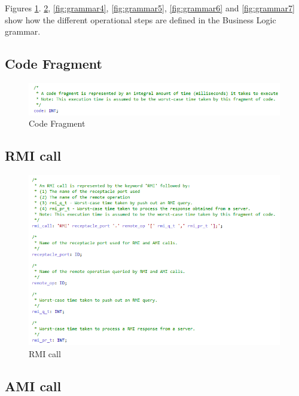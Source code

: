 Figures \ref{fig:code_fragment}. \ref{fig:grammar3}, \ref{fig:grammar4}, \ref{fig:grammar5}, \ref{fig:grammar6} and \ref{fig:grammar7} show how the different operational steps are defined in the Business Logic grammar. 

\subsection{Code Fragment}

\begin{figure}[ht]
\centering
\includegraphics[width=0.99\textwidth]{./figs/Grammar_code}
\caption{Code Fragment}
\label{fig:code_fragment}
\vspace{-0.2in}
\end{figure}
\vspace{0.1in}



\subsection{RMI call}

\begin{figure}[ht]
\centering
\includegraphics[width=0.99\textwidth]{./figs/Grammar_3}
\caption{RMI call}
\label{fig:grammar3}
\vspace{-0.2in}
\end{figure}
\vspace{0.1in}

\subsection{AMI call}

